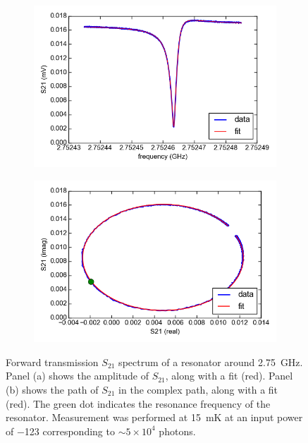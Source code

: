 \documentclass[12pt]{report}
\newcommand{\figureinset}[3]{\llap{\parbox[b]{#2in}{#1\\\rule{0ex}{#3in}}}}
\begin{document}
\begin{figure}[h]
    \centering
    \begin{subfigure}[b]{.49\textwidth}
        \label{fig:resonator_amplitude}
        \includegraphics[width=\textwidth]{Figures/resonator_amplitude.png}\figureinset{(a)}{2.55}{2.0}
    \end{subfigure}
    \begin{subfigure}[b]{.49\textwidth}
        \label{fig:resonator_complex}
        \includegraphics[width=\textwidth]{Figures/resonator_complex.png}\figureinset{(b)}{2.55}{2.0}
    \end{subfigure}
    \caption{Forward transmission $S_{21}$ spectrum of a resonator around \SI{2.75}{\giga \hertz}. Panel (a) shows the amplitude of $S_{21}$, along with a fit (red). Panel (b) shows the path of $S_{21}$ in the complex path, along with a fit (red). The green dot indicates the resonance frequency of the resonator.  Measurement was performed at \SI{15}{\milli \kelvin} at an input power of \SI{-123}{\dBm} corresponding to $\sim 5 \times 10^4$ photons.}
    \label{fig:resonator}
\end{figure}
\end{document}
